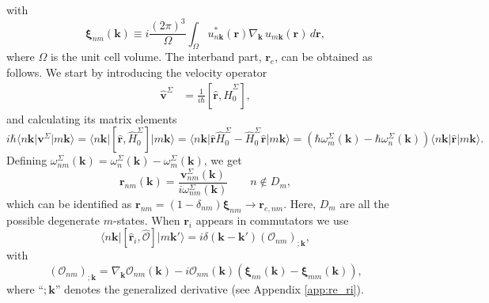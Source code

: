 with
\begin{equation}\label{zetann}
\boldsymbol{\xi}_{nm}(\mathbf{k})
\equiv i\frac{(2\pi)^3}{\Omega}
\int_{\Omega}u^{*}_{n\mathbf{k}}(\mathbf{r})
\nabla_{\mathbf{k}}\,u_{m\mathbf{k}}(\mathbf{r})
\,d\mathbf{r},
\end{equation}
where $\Omega$ is the unit cell volume. The interband part, $\mathbf{r}_{e}$,
can be obtained as follows. We start by introducing the velocity operator
\begin{align}\label{vop}
\hat{\mathbf{v}}^{\Sigma} &=
\frac{1}{i\hbar}\left[\hat{\mathbf{r}},\hat{H}^{\Sigma}_{0}\right],
\end{align}
and calculating its matrix elements
\begin{equation}\label{conhrnm}
i\hbar\langle n\mathbf{k}\vert\mathbf{v}^\Sigma\vert m\mathbf{k}\rangle
= \langle n\mathbf{k}\vert
\left[
\hat{\mathbf{r}}, \hat{H}^{\Sigma}_{0}
\right]
  \vert m\mathbf{k}\rangle
= \langle n\mathbf{k}\vert
\hat{\mathbf{r}}\hat{H}^{\Sigma}_{0} - \hat{H}^{\Sigma}_{0}\hat{\mathbf{r}}
\vert m\mathbf{k}\rangle
=
\left(
\hbar\omega^{\Sigma}_{m}(\mathbf{k}) - \hbar\omega^{\Sigma}_{n}(\mathbf{k})
\right)
\langle n\mathbf{k}\vert\hat{\mathbf{r}}\vert m\mathbf{k}\rangle.
\end{equation}
Defining $\omega^\Sigma_{nm}(\mathbf{k}) =
\omega^{\Sigma}_{n}(\mathbf{k}) - \omega^\Sigma_m(\mathbf{k})$, we get
\begin{equation}\label{pmnrmn}
\mathbf{r}_{nm}(\mathbf{k})
= \frac{\mathbf{v}^\Sigma_{nm}(\mathbf{k})}{i\omega^\Sigma_{nm}(\mathbf{k})}
\qquad n\notin D_{m},
\end{equation} 
which can be identified as
$\mathbf{r}_{nm}=(1-\delta_{nm})\boldsymbol{\xi}_{nm}\to \mathbf{r}_{e,nm}$.
Here, $D_m$ are all the possible degenerate $m$-states. When $\mathbf{r}_{i}$
appears in commutators we use \cite{aversaPRB95}
\begin{equation}\label{conmri3n}
\langle n\mathbf{k}\vert
\left[
\hat{\mathbf{r}}_{i}, \hat{\mathcal{O}}
\right]
\vert m\mathbf{k}'\rangle
= i\delta(\mathbf{k} - \mathbf{k}')(\mathcal{O}_{nm})_{;\mathbf{k}},
\end{equation}  
with
\begin{equation}\label{gendevnn}
(\mathcal{O}_{nm})_{;\mathbf{k}} =
  \nabla_{\mathbf{k}}\mathcal{O}_{nm}(\mathbf{k})
- i\mathcal{O}_{nm}(\mathbf{k})
\left(
\boldsymbol{\xi}_{nn}(\mathbf{k}) - \boldsymbol{\xi}_{mm}(\mathbf{k})
\right),
\end{equation} 
where ``$;\mathbf{k}$'' denotes the generalized derivative (see Appendix
\ref{app:re_ri}).

